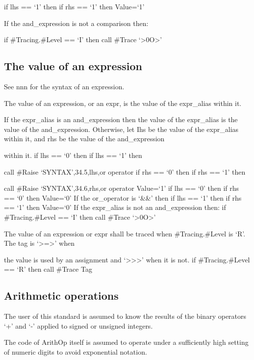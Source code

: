 if lhs == `1' then if rhs == `1' then Value=`1'

If the and\_expression is not a comparison then:

if \#Tracing.\#Level == `I' then call \#Trace
`\textgreater0O\textgreater{}'

\hypertarget{the-value-of-an-expression}{%
\subsection{The value of an
expression}\label{the-value-of-an-expression}}

See nnn for the syntax of an expression.

The value of an expression, or an expr, is the value of the expr\_alias
within it.

If the expr\_alias is an and\_expression then the value of the
expr\_alias is the value of the and\_expression. Otherwise, let Ihs be
the value of the expr\_alias within it, and rhs be the value of the
and\_expression

within it. if lhs == `0' then if lhs == `1' then

call \#Raise `SYNTAX',34.5,lhs,or operator if rhs == `0' then if rhs ==
`1' then

call \#Raise `SYNTAX',34.6,rhs,or operator Value=`1' if lhs == `0' then
if rhs == `0' then Value=`0' If the or\_operator is `\&\&' then if lhs
== `1' then if rhs == `1' then Value=`0' If the expr\_alias is not an
and\_expression then: if \#Tracing.\#Level == `I' then call \#Trace
`\textgreater0O\textgreater{}'

The value of an expression or expr shall be traced when
\#Tracing.\#Level is `R'. The tag is `\textgreater=\textgreater{}' when

the value is used by an assignment and
`\textgreater\textgreater\textgreater{}' when it is not. if
\#Tracing.\#Level == `R' then call \#Trace Tag

\hypertarget{arithmetic-operations}{%
\subsection{Arithmetic operations}\label{arithmetic-operations}}

The user of this standard is assumed to know the results of the binary
operators `+' and `-' applied to signed or unsigned integers.

The code of ArithOp itself is assumed to operate under a sufficiently
high setting of numeric digits to avoid exponential notation.

